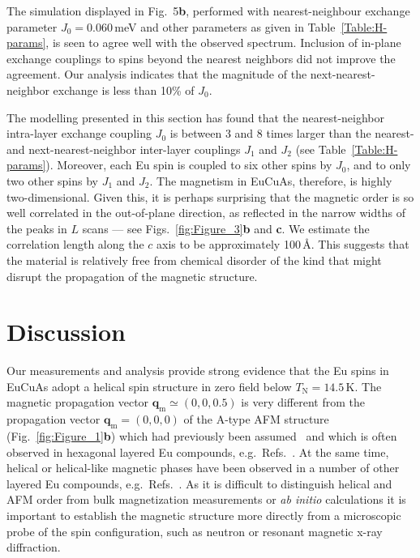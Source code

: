 \documentclass[aps,prl,amsmath,amssymb,amstext,citeautoscript,punctuation,nofootinbib,superscriptaddress,twocolumn]{revtex4-1}
\begin{document}
The simulation displayed in Fig.~5\textbf{b}, performed with nearest-neighbour exchange parameter $J_0 = 0.060$\,meV and other parameters as given in Table~\ref{Table:H-params}, is seen to agree well with the observed spectrum. Inclusion of in-plane exchange couplings to spins beyond the nearest neighbors did not improve the agreement. Our analysis indicates that the magnitude of the next-nearest-neighbor exchange is less than 10\% of $J_0$. 

The modelling presented in this section has found that the nearest-neighbor intra-layer exchange coupling $J_0$ is between 3 and 8 times larger than the nearest- and next-nearest-neighbor inter-layer couplings $J_1$ and $J_2$ (see Table~\ref{Table:H-params}).  Moreover, each Eu spin is coupled to six other spins by $J_0$, and to only two other spins by $J_1$ and $J_2$. The magnetism in EuCuAs, therefore, is highly two-dimensional. Given this, it is perhaps surprising that the magnetic order is so well correlated in the out-of-plane direction, as reflected in the narrow widths of the peaks in $L$ scans --- see Figs.~\ref{fig:Figure_3}\textbf{b} and \textbf{c}. We estimate the correlation length along the $c$ axis to be approximately 100\,\AA. This suggests that the material is relatively free from chemical disorder of the kind that might disrupt the propagation of the magnetic structure.

\section{Discussion}

Our measurements and analysis provide strong evidence that the Eu spins in EuCuAs adopt a helical spin structure in zero field  below $T_\textrm{N} = 14.5$\,K. The magnetic propagation vector $\textbf{q}_\textrm{m} \simeq (0, 0, 0.5)$  is very different from the propagation vector $\textbf{q}_\textrm{m} = (0, 0, 0)$ of the A-type AFM structure  (Fig.~\ref{fig:Figure_1}\textbf{b}) which had previously been assumed~\cite{tong2014magnetic} and which is often observed in hexagonal layered Eu compounds, e.g.~Refs.~\cite{Rahn_2018_ECA,Soh_2019_ECS,Blawat_2022_EZA,Gui_2019_ESP,Marshall_2021_EMB,Pakhira_2022_EMS}. 
At the same time, helical or helical-like magnetic phases have been observed in a number of other layered Eu compounds, e.g.~Refs.~\cite{Riberolles_2021_EIA,Soh_2023_EIA,Reehius_1992_ECP,Jin_2019_ENA,Sangeetha_2019_ENA,Iida_2019_ERFA,Kurumaji_2022_EZG,Takahasi_2020_ECS}.
As it is difficult to distinguish helical and AFM order from bulk magnetization measurements or \textit{ab initio} calculations it is important to establish the magnetic structure more directly from a microscopic probe of the spin configuration, such as neutron or resonant magnetic x-ray diffraction.
\end{document}
